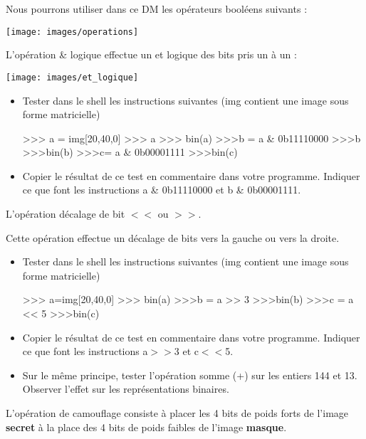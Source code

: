 \documentclass[10pt]{article}
\begin{document}
Nous pourrons utiliser dans ce DM les opérateurs booléens suivants :
\begin{center}
\texttt{[image: images/operations]}
\end{center}

L'opération \& logique effectue un et logique des bits pris un à un :
\begin{center}
\texttt{[image: images/et\_logique]}
\end{center}

\begin{itemize}
\item Tester dans le shell les instructions suivantes (img contient une image sous forme matricielle)
\begin{python}
>>> a = img[20,40,0]
>>> a
>>> bin(a)
>>>b = a & 0b11110000
>>>b
>>>bin(b)
>>>c= a & 0b00001111
>>>bin(c)
\end{python}

\item Copier le résultat de ce test en commentaire dans votre programme. Indiquer ce que font les instructions  a \& 0b11110000 et  b \& 0b00001111.
\end{itemize}


L'opération décalage de bit $<<$ ou $>>$.

Cette opération effectue un décalage de bits vers la gauche ou vers la droite.
\begin{itemize}
\item Tester dans le shell les instructions suivantes (img contient une image sous forme matricielle)
\begin{python}
>>> a=img[20,40,0]
>>> bin(a)
>>>b = a >> 3
>>>bin(b)
>>>c = a << 5
>>>bin(c)
\end{python}

\item Copier le résultat de ce test en commentaire dans votre programme. Indiquer ce que font les instructions  a$>>$3 et c$<<$5.
\item Sur le même principe, tester l’opération somme (+) sur les entiers 144 et 13. Observer l’effet sur les représentations binaires.
\end{itemize}

L’opération de camouflage consiste à placer les 4 bits de poids forts de l’image \textbf{secret} à la place des 4 bits de poids faibles de l’image \textbf{masque}. 
\end{document}
